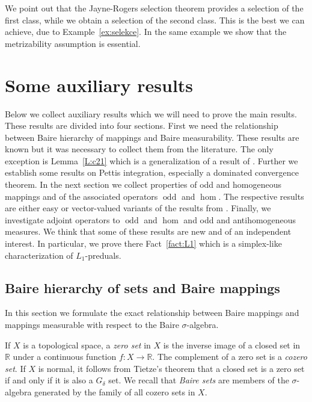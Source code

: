 \documentclass{amsart}
\numberwithin{equation}{section}
\theoremstyle{definition}
\def\er{\mathbb R}
\def\hom{\operatorname{hom}}
\def\odd{\operatorname{odd}}
\begin{document}
We point out that the Jayne-Rogers selection theorem provides a selection of the first class, while we obtain a selection of the second class. This is the best we can achieve, due to Example~\ref{ex:selekce}. In the same example we show that the metrizability assumption is essential.

\section{Some auxiliary results}\label{Sec:auxiliary}

Below we collect auxiliary results which we will need to prove the main results. These results are divided into four sections.
First we need the relationship between Baire hierarchy of mappings and Baire measurability. These results are known but it was necessary to collect them from the literature. The only exception is Lemma~\ref{L:c21} which is a generalization of a result of \cite{MeSta}. Further we establish some results on Pettis integration, especially a dominated convergence theorem. In the next section we collect properties of odd and homogeneous mappings and of the associated operators $\odd$ and $\hom$. The respective results are either easy or vector-valued variants of the results from \cite{lusp-complex}.
Finally, we investigate adjoint operators to $\odd$ and $\hom$ and odd and antihomogeneous measures. We think that some of these results are new and of an independent interest. In particular, we prove there Fact~\ref{fact:L1} which is a simplex-like characterization of $L_1$-preduals.

\subsection{Baire hierarchy of sets and Baire mappings}
In this section we formulate the exact relationship between Baire mappings and mappings measurable with respect to the Baire $\sigma$-algebra.

If $X$ is a topological space, a \emph{zero set} in $X$ is the  inverse image of a closed set in $\er$ under a continuous function $f:X\to\er$. The complement of a zero set is a \emph{cozero set}. If $X$ is normal, it follows from Tietze's theorem that a closed set is a zero set if and only if it is also a $G_\delta$ set. We recall that \emph{Baire sets} are members of the $\sigma$-algebra generated by  the family of all cozero sets in $X$.
\end{document}
